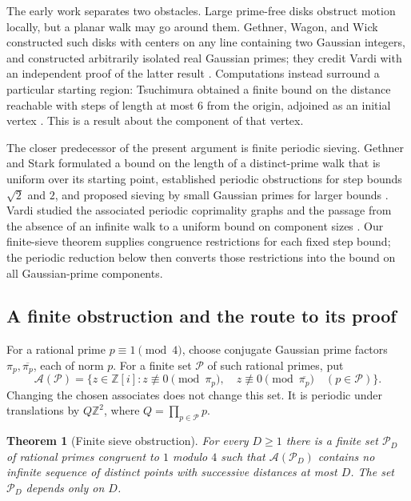 \documentclass[11pt]{article}
\newtheorem{theorem}{Theorem}[section]
\theoremstyle{definition}
\theoremstyle{remark}
\newcommand{\Z}{\mathbb Z}
\numberwithin{equation}{section}
\begin{document}
The early work separates two obstacles. Large prime-free disks obstruct
motion locally, but a planar walk may go around them. Gethner, Wagon,
and Wick constructed such disks with centers on any line containing two
Gaussian integers, and constructed arbitrarily isolated real Gaussian
primes; they credit Vardi with an independent proof of the latter result
\cite[Theorems 4.1 and 4.4]{GethnerWagonWick}.
Computations instead surround a particular starting region:
Tsuchimura obtained a finite bound on the distance reachable with steps
of length at most $6$ from the origin, adjoined as an initial vertex
\cite{Tsuchimura}. This is a result about the component of that vertex.

The closer predecessor of the present argument is finite periodic
sieving. Gethner and Stark formulated a bound on the length of a
distinct-prime walk that is uniform over its starting point, established
periodic obstructions for step bounds $\sqrt2$ and $2$, and proposed
sieving by small Gaussian primes for larger bounds
\cite[pp.~290--292]{GethnerStark}. Vardi studied the associated periodic
coprimality graphs and the passage from the absence of an infinite walk
to a uniform bound on component sizes
\cite[Section 6, Proposition 6.2]{Vardi}.
Our finite-sieve theorem supplies congruence restrictions for each fixed
step bound; the periodic reduction below then converts those restrictions
into the bound on all Gaussian-prime components.


\subsection{A finite obstruction and the route to its proof}
For a rational prime $p\equiv1\pmod4$, choose conjugate Gaussian prime
factors $\pi_p,\overline{\pi_p}$, each of norm $p$.
For a finite set $\mathcal P$ of such rational primes, put
\[
\mathcal A(\mathcal P)=\{z\in\Z[i]:
 z\not\equiv0\pmod{\pi_p},\quad
 z\not\equiv0\pmod{\overline{\pi_p}}\quad(p\in\mathcal P)\}.
\]
Changing the chosen associates does not change this set. It is periodic
under translations by $Q\Z^2$, where $Q=\prod_{p\in\mathcal P}p$.

\begin{theorem}[Finite sieve obstruction]\label{thm:sieve}
For every $D\ge1$ there is a finite set $\mathcal P_D$ of rational
primes congruent to $1$ modulo $4$ such that $\mathcal A(\mathcal P_D)$
contains no infinite sequence of distinct points with successive distances
at most $D$. The set $\mathcal P_D$ depends only on $D$.
\end{theorem}
\end{document}
